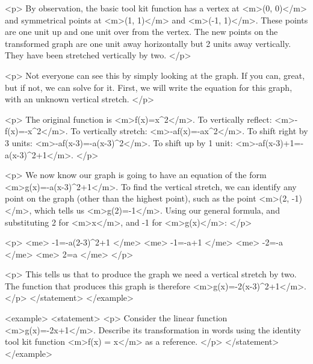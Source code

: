                 <p>
                    By observation, the basic tool kit function has a vertex at <m>(0, 0)</m> and symmetrical points at <m>(1, 1)</m> and <m>(-1, 1)</m>.
                    These points are one unit up and one unit over from the vertex.
                    The new points on the transformed graph are one unit away horizontally but 2 units away vertically.
                    They have been stretched vertically by two.
                </p>

                <p>
                    Not everyone can see this by simply looking at the graph.
                    If you can, great, but if not, we can solve for it.
                    First, we will write the equation for this graph, with an unknown vertical stretch.
                </p>

                <p>
                    The original function is <m>f(x)=x^{2}</m>.
                    To vertically reflect: <m>-f(x)=-x^{2}</m>.
                    To vertically stretch: <m>-af(x)=-ax^{2}</m>.
                    To shift right by 3 units: <m>-af(x-3)=-a(x-3)^{2}</m>.
                    To shift up by 1 unit: <m>-af(x-3)+1=-a(x-3)^{2}+1</m>.
                </p>

                <p>
                    We now know our graph is going to have an equation of the form <m>g(x)=-a(x-3)^{2}+1</m>.
                    To find the vertical stretch, we can identify any point on the graph (other than the highest point), such as the point <m>(2, -1)</m>, which tells us <m>g(2)=-1</m>.
                    Using our general formula, and substituting 2 for <m>x</m>, and -1 for <m>g(x)</m>:
                </p>

                <p>
                    <me>
                        -1=-a(2-3)^{2}+1
                    </me>
                    <me>
                        -1=-a+1
                    </me>
                    <me>
                        -2=-a
                    </me>
                    <me>
                        2=a
                    </me>
                </p>

                <p>
                    This tells us that to produce the graph we need a vertical stretch by two.
                    The function that produces this graph is therefore <m>g(x)=-2(x-3)^{2}+1</m>.
                </p>
            </statement>
        </example>

        <example>
            <statement>
                <p>
                    Consider the linear function <m>g(x)=-2x+1</m>.
                    Describe its transformation in words using the identity tool kit function <m>f(x) = x</m> as a reference.
                </p>
            </statement>
        </example>


